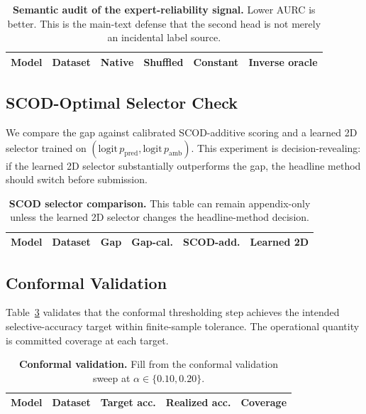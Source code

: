 \begin{table}[t]
\centering
\caption{\textbf{Semantic audit of the expert-reliability signal.} Lower AURC
is better. This is the main-text defense that the second head is not merely an
incidental label source.}
\label{tab:yexpert-audit}
\begin{tabular}{llrrrr}
\toprule
Model & Dataset & Native & Shuffled & Constant & Inverse oracle \\
\midrule
\bottomrule
\end{tabular}
\end{table}

\subsection{SCOD-Optimal Selector Check}
\label{sec:results-scod-selector}

We compare the gap against calibrated SCOD-additive scoring and a learned 2D
selector trained on $(\mathrm{logit}\,p_{\mathrm{pred}},
\mathrm{logit}\,p_{\mathrm{amb}})$. This experiment is decision-revealing: if
the learned 2D selector substantially outperforms the gap, the headline method
should switch before submission.

\begin{table}[t]
\centering
\caption{\textbf{SCOD selector comparison.} This table can remain appendix-only
unless the learned 2D selector changes the headline-method decision.}
\label{tab:scod-selector}
\begin{tabular}{llrrrr}
\toprule
Model & Dataset & Gap & Gap-cal. & SCOD-add. & Learned 2D \\
\midrule
\bottomrule
\end{tabular}
\end{table}

\subsection{Conformal Validation}
\label{sec:results-conformal}

Table~\ref{tab:conformal-validation} validates that the conformal thresholding
step achieves the intended selective-accuracy target within finite-sample
tolerance. The operational quantity is committed coverage at each target.

\begin{table}[t]
\centering
\caption{\textbf{Conformal validation.} Fill from the conformal validation
sweep at $\alpha \in \{0.10, 0.20\}$.}
\label{tab:conformal-validation}
\begin{tabular}{llrrr}
\toprule
Model & Dataset & Target acc. & Realized acc. & Coverage \\
\midrule
\bottomrule
\end{tabular}
\end{table}


